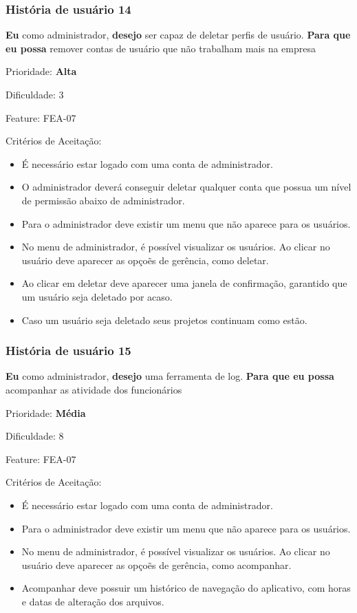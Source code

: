   \subsubsection{História de usuário 14}
    \textbf{Eu} como administrador, \textbf{desejo} ser capaz de deletar perfis de usuário. \textbf{Para que eu possa} remover contas de usuário que não trabalham mais na empresa

    Prioridade: \textbf{Alta}

    Dificuldade: 3

    Feature: FEA-07

    Critérios de Aceitação:
    \begin{itemize}
      \item É necessário estar logado com uma conta de administrador. 
      \item O administrador deverá conseguir deletar qualquer conta que possua um nível de permissão abaixo de administrador.
      \item Para o administrador deve existir um menu que não aparece para os usuários.
      \item No menu de administrador, é possível visualizar os usuários. Ao clicar no usuário deve aparecer as opçoẽs de gerência, como deletar.
      \item Ao clicar em deletar deve aparecer uma janela de confirmação, garantido que um usuário seja deletado por acaso.
      \item Caso um usuário seja deletado seus projetos continuam como estão.
    \end{itemize}

  \subsubsection{História de usuário 15}
    \textbf{Eu} como administrador, \textbf{desejo} uma ferramenta de log. \textbf{Para que eu possa} acompanhar as atividade dos funcionários

    Prioridade: \textbf{Média}

    Dificuldade: 8

    Feature: FEA-07

    Critérios de Aceitação:
    \begin{itemize}
      \item É necessário estar logado com uma conta de administrador. 
      \item Para o administrador deve existir um menu que não aparece para os usuários.
      \item No menu de administrador, é possível visualizar os usuários. Ao clicar no usuário deve aparecer as opçoẽs de gerência, como acompanhar.
      \item Acompanhar deve possuir um histórico de navegação do aplicativo, com horas e datas de alteração dos arquivos.
    \end{itemize}

